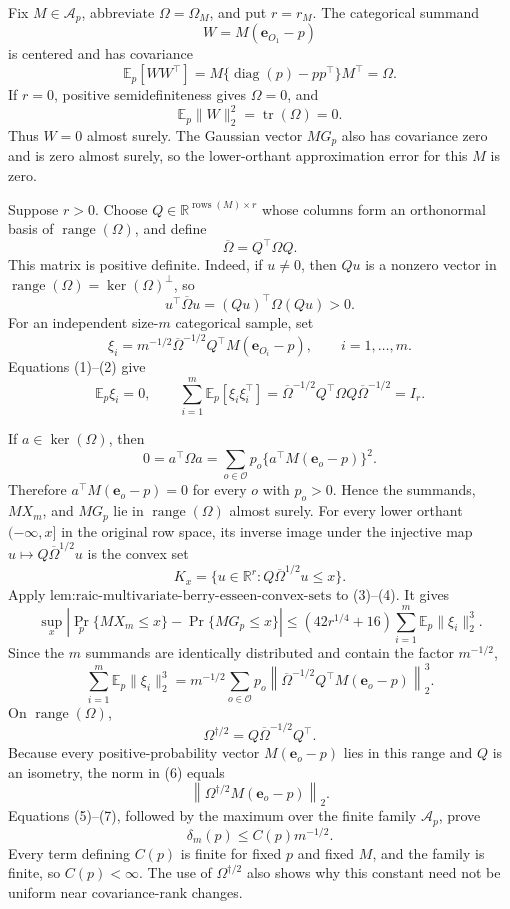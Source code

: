Fix \(M\in\mathcal A_p\), abbreviate \(\Omega=\Omega_M\), and put \(r=r_M\).  The categorical summand
\[
W=M(\mathbf e_{O_1}-p)
\]
is centered and has covariance
\[
\mathbb E_p[WW^{\top}]
=M\{\operatorname{diag}(p)-pp^{\top}\}M^{\top}=\Omega.
\tag{1}
\]
If \(r=0\), positive semidefiniteness gives \(\Omega=0\), and
\[
\mathbb E_p\|W\|_2^2=\operatorname{tr}(\Omega)=0.
\]
Thus \(W=0\) almost surely.  The Gaussian vector \(MG_p\) also has covariance zero and is zero almost surely, so the lower-orthant approximation error for this \(M\) is zero.

Suppose \(r>0\).  Choose \(Q\in\mathbb R^{\operatorname{rows}(M)\times r}\) whose columns form an orthonormal basis of \(\operatorname{range}(\Omega)\), and define
\[
\overline\Omega=Q^{\top}\Omega Q.
\]
This matrix is positive definite.  Indeed, if \(u\neq0\), then \(Qu\) is a nonzero vector in \(\operatorname{range}(\Omega)=\ker(\Omega)^{\perp}\), so
\[
u^{\top}\overline\Omega u=(Qu)^{\top}\Omega(Qu)>0.
\tag{2}
\]
For an independent size-\(m\) categorical sample, set
\[
\xi_i=m^{-1/2}\overline\Omega^{-1/2}Q^{\top}M(\mathbf e_{O_i}-p),
\qquad i=1,\ldots,m.
\]
Equations (1)--(2) give
\[
\mathbb E_p\xi_i=0,
\qquad
\sum_{i=1}^m\mathbb E_p[\xi_i\xi_i^{\top}]
=\overline\Omega^{-1/2}Q^{\top}\Omega Q\overline\Omega^{-1/2}=I_r.
\tag{3}
\]

If \(a\in\ker(\Omega)\), then
\[
0=a^{\top}\Omega a=\sum_{o\in\mathcal O}p_o
\{a^{\top}M(\mathbf e_o-p)\}^2.
\]
Therefore \(a^{\top}M(\mathbf e_o-p)=0\) for every \(o\) with \(p_o>0\).  Hence the summands, \(MX_m\), and \(MG_p\) lie in \(\operatorname{range}(\Omega)\) almost surely.  For every lower orthant \(( -\infty,x]\) in the original row space, its inverse image under the injective map \(u\mapsto Q\overline\Omega^{1/2}u\) is the convex set
\[
K_x=\{u\in\mathbb R^r:Q\overline\Omega^{1/2}u\leq x\}.
\tag{4}
\]
Apply \(\text{lem:raic-multivariate-berry-esseen-convex-sets}\) to (3)--(4).  It gives
\[
\sup_x\left|\Pr_p\{MX_m\leq x\}-\Pr\{MG_p\leq x\}\right|
\leq(42r^{1/4}+16)\sum_{i=1}^m\mathbb E_p\|\xi_i\|_2^3.
\tag{5}
\]
Since the \(m\) summands are identically distributed and contain the factor \(m^{-1/2}\),
\[
\sum_{i=1}^m\mathbb E_p\|\xi_i\|_2^3
=m^{-1/2}\sum_{o\in\mathcal O}p_o
\left\|\overline\Omega^{-1/2}Q^{\top}M(\mathbf e_o-p)\right\|_2^3.
\tag{6}
\]
On \(\operatorname{range}(\Omega)\),
\[
\Omega^{\dagger/2}=Q\overline\Omega^{-1/2}Q^{\top}.
\]
Because every positive-probability vector \(M(\mathbf e_o-p)\) lies in this range and \(Q\) is an isometry, the norm in (6) equals
\[
\left\|\Omega^{\dagger/2}M(\mathbf e_o-p)\right\|_2.
\tag{7}
\]
Equations (5)--(7), followed by the maximum over the finite family \(\mathcal A_p\), prove
\[
\delta_m(p)\leq C(p)m^{-1/2}.
\tag{8}
\]
Every term defining \(C(p)\) is finite for fixed \(p\) and fixed \(M\), and the family is finite, so \(C(p)<\infty\).  The use of \(\Omega^{\dagger/2}\) also shows why this constant need not be uniform near covariance-rank changes.

